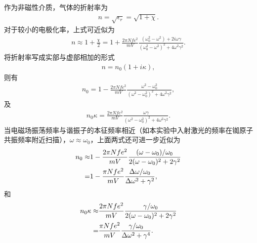 \documentclass[a4paper, 10pt]{article}
\begin{document}
\begin{multicols*}{2}
作为非磁性介质，气体的折射率为
\begin{align}
    n=\sqrt{\epsilon_r}=\sqrt{1+\chi}.
\end{align}
对于较小的电极化率，上式可近似为
\begin{align}
    n\approx 1+\frac{\chi}{2}=1+\frac{2\pi Nfe^2}{mV}\frac{(\omega_0^2-\omega^2)+2i\omega\gamma}{(\omega_0^2-\omega^2)^2+4\omega^2\gamma^2}.
\end{align}
将折射率写成实部与虚部相加的形式
\begin{align}
    n=n_0(1+i\kappa),
\end{align}
则有
\begin{align}
    n_0=1-\frac{2\pi Nfe^2}{mV}\frac{\omega^2-\omega_0^2}{(\omega^2-\omega_0^2)^2+4\omega^2\gamma^2},
\end{align}
及
\begin{align}
    n_0\kappa=\frac{2\pi Nfe^2}{mV}\frac{\omega\gamma}{(\omega^2-\omega_0^2)^2+4\omega^2\gamma^2}.
\end{align}
当电磁场振荡频率与谐振子的本征频率相近（如本实验中入射激光的频率在铷原子共振频率附近扫描），$\omega\approx\omega_0$，上面两式还可进一步近似为
\begin{align}
    \notag n_0\approx&1-\frac{2\pi Nfe^2}{mV}\frac{(\omega-\omega_0)/\omega_0}{2(\omega-\omega_0)^2+2\gamma^2}\\
    =&1-\frac{\pi Nfe^2}{mV}\frac{\Delta\omega/\omega_0}{\Delta\omega^2+\gamma^2},
\end{align}
和
\begin{align}
    \notag n_0\kappa\approx&\frac{2\pi Nfe^2}{mV}\frac{\gamma/\omega_0}{2(\omega-\omega_0)^2+2\gamma^2}\\
    =&\frac{\pi Nfe^2}{mV}\frac{\gamma/\omega_0}{\Delta\omega^2+\gamma^4}.
\end{align}


\end{multicols*}
\end{document}
